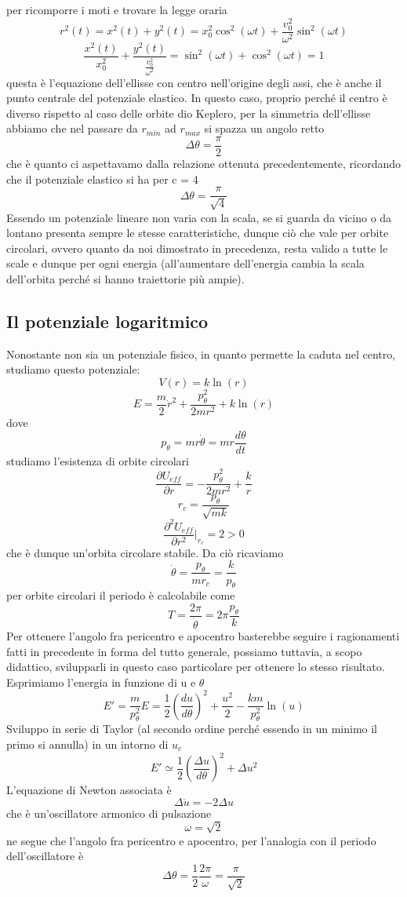 \documentclass[
10pt, %
a4paper, %
oneside, %
headinclude,footinclude, %
BCOR5mm, %
]{scrartcl}
\begin{document}
per ricomporre i moti e trovare la legge oraria 
\[r^2(t) = x^2(t)+y^2(t) =  x_0^2\cos^2(\omega t)+\frac{v_0^2}{\omega^2}\sin^2(\omega t)\]
\[\frac{x^2(t)}{x_0^2}+\frac{y^2(t)}{\frac{v_0^2}{\omega^2}} = \sin^2(\omega t)+\cos^2(\omega t) = 1\]
questa è l'equazione dell'ellisse con centro nell'origine degli assi, che è anche il punto centrale del potenziale elastico. In questo caso, proprio perché il centro è diverso rispetto al caso delle orbite dio Keplero, per la simmetria dell'ellisse abbiamo che nel passare da \(r_{min}\) ad \(r_{max}\) si spazza un angolo retto
\[\Delta \theta = \frac{\pi}{2}\]
che è quanto ci aspettavamo dalla relazione ottenuta precedentemente, ricordando che il potenziale elastico si ha per c = 4
\[\Delta\theta = \frac{\pi}{\sqrt{4}}\]
Essendo un potenziale lineare non varia con la scala, se si guarda da vicino o da lontano presenta sempre le stesse caratteristiche, dunque ciò che vale per orbite circolari, ovvero quanto da noi dimostrato in precedenza, resta valido a tutte le scale e dunque per ogni energia (all'aumentare dell'energia cambia la scala dell'orbita perché si hanno traiettorie più ampie). 
\subsection{Il potenziale logaritmico}
Nonostante non sia un potenziale fisico, in quanto permette la caduta nel centro, studiamo questo potenziale:
\[V(r) = k\ln(r)\]
\[E = \frac{m}{2}\dot{r}^2+\frac{p_\theta^2}{2mr^2}+k\ln(r)\]
dove
\[p_\theta = mr\dot{\theta} = mr\frac{d\theta}{dt}\]
studiamo l'esistenza di orbite circolari
\[\frac{\partial U_{eff}}{\partial r} = -\frac{p_\theta^2}{2mr^2}+\frac{k}{r}\]
\[r_c = \frac{p_\theta}{\sqrt{mk}}\]
\[\frac{\partial^2 U_{eff}}{\partial r^2}|_{r_c} = 2 > 0\]
che è dunque un'orbita circolare stabile. Da ciò ricaviamo
\[\dot{\theta} = \frac{p_\theta}{mr_c} = \frac{k}{p_\theta}\]
per orbite circolari il periodo è calcolabile come
\[T = \frac{2\pi}{\dot{\theta}} = 2\pi\frac{p_\theta}{k}\]
Per ottenere l'angolo fra pericentro e apocentro basterebbe seguire i ragionamenti fatti in precedente in forma del tutto generale, possiamo tuttavia, a scopo didattico, svilupparli in questo caso particolare per ottenere lo stesso risultato. Esprimiamo l'energia in funzione di u e $\theta$
\[E' = \frac{m}{p_\theta^2} E = \frac{1}{2}\left(\frac{du}{d\theta}\right)^2 +\frac{u^2}{2}-\frac{km}{p_\theta^2}\ln(u)\]
Sviluppo in serie di Taylor (al secondo ordine perché essendo in un minimo il primo si annulla) in un intorno di \(u_c\)
\[E' \simeq \frac{1}{2}\left(\frac{\Delta u}{d\theta}\right)^2+\Delta u^2\]
L'equazione di Newton associata è
\[\Delta \ddot{u} = -2\Delta u\]
che è un'oscillatore armonico di pulsazione
\[\omega = \sqrt{2}\]
ne segue che l'angolo fra pericentro e apocentro, per l'analogia con il periodo dell'oscillatore è
\[\Delta\theta =\frac{1}{2}\frac{2\pi}{\omega} = \frac{\pi}{\sqrt{2}}\]
\end{document}
